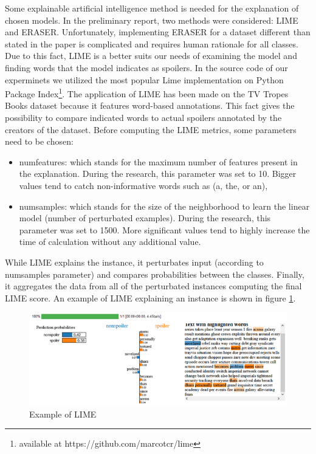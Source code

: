 \documentclass[11pt]{article}
\begin{document}
Some explainable artificial intelligence method is needed for the explanation of chosen models. In the preliminary report, two methods were considered: LIME and ERASER. Unfortunately, implementing ERASER for a dataset different than stated in the paper is complicated and requires human rationale for all classes. Due to this fact, LIME is a better suits our needs of examining the model and finding words that the model indicates as spoilers. In the source code of our experminets we utilized the most popular Lime implementation on Python Package Index\footnote{available at https://github.com/marcotcr/lime}. The application of LIME has been made on the TV Tropes Books dataset because it features word-based annotations. This fact gives the possibility to compare indicated words to actual spoilers annotated by the creators of the dataset.
Before computing the LIME metrics, some parameters need to be chosen:

\begin{itemize}
    \item  numfeatures: which stands for the maximum number of features present in the explanation. During the research, this parameter was set to 10. Bigger values tend to catch non-informative words such as (a, the, or an),

    \item numsamples: which stands for the size of the neighborhood to learn the linear model (number of perturbated examples). During the research, this parameter was set to 1500. More significant values tend to highly increase the time of calculation without any additional value.
\end{itemize}

While LIME explains the instance, it perturbates input (according to numsamples parameter) and compares probabilities between the classes. Finally, it aggregates the data from all of the perturbated instances computing the final LIME score. An example of LIME explaining an instance is shown in figure \ref{fig:LIMEexample}.

\begin{figure}[h]
    \centering
    \includegraphics[width=\columnwidth]{img/Obraz1.png}
    \caption{Example of LIME} 
    \label{fig:LIMEexample}
\end{figure}
\end{document}
